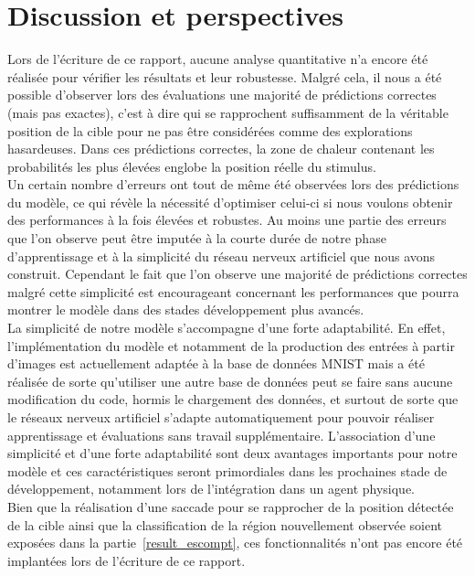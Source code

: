 
\chapter{Discussion et perspectives} %

\label{Discussion} %


Lors de l'écriture de ce rapport, aucune analyse quantitative n'a encore été réalisée pour vérifier les résultats et leur robustesse.
Malgré cela, il nous a été possible d'observer lors des évaluations une majorité de prédictions correctes (mais pas exactes), c'est à dire qui se rapprochent suffisamment de la véritable position de la cible pour ne pas être considérées comme des explorations hasardeuses.
Dans ces prédictions correctes, la zone de chaleur contenant les probabilités les plus élevées englobe la position réelle du stimulus. \\
Un certain nombre d'erreurs ont tout de même été observées lors des prédictions du modèle, ce qui révèle la nécessité d'optimiser celui-ci si nous voulons obtenir des performances à la fois élevées et robustes. 
Au moins une partie des erreurs que l'on observe peut être imputée à la courte durée de notre phase d'apprentissage et à la simplicité du réseau nerveux artificiel que nous avons construit.
Cependant le fait que l'on observe une majorité de prédictions correctes malgré cette simplicité est encourageant concernant les performances que pourra montrer le modèle dans des stades développement plus avancés. \\
La simplicité de notre modèle s'accompagne d'une forte adaptabilité.
En effet, l'implémentation du modèle et notamment de la production des entrées à partir d'images est actuellement adaptée à la base de données MNIST mais a été réalisée de sorte qu'utiliser une autre base de données peut se faire sans aucune modification du code, hormis le chargement des données, et surtout de sorte que le réseaux nerveux artificiel s'adapte automatiquement pour pouvoir réaliser apprentissage et évaluations sans travail supplémentaire.
L'association d'une simplicité et d'une forte adaptabilité sont deux avantages importants pour notre modèle et ces caractéristiques seront primordiales dans les prochaines stade de développement, notamment lors de l'intégration dans un agent physique. \\
Bien que la réalisation d'une saccade pour se rapprocher de la position détectée de la cible ainsi que la classification de la région nouvellement observée soient exposées dans la partie~\ref{result_escompt}, ces fonctionnalités n'ont pas encore été implantées lors de l'écriture de ce rapport. \\

